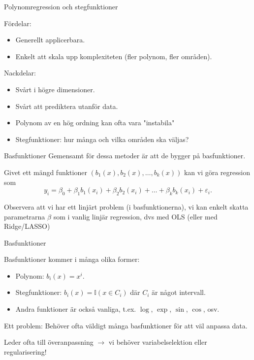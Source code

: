 \documentclass[10pt,english]{beamer}
\begin{document}
\begin{frame}{Polynomregression och stegfunktioner}
    
    Fördelar:
    \begin{itemize}
        \item Generellt applicerbara.
        \item Enkelt att skala upp komplexiteten (fler polynom, fler områden).
    \end{itemize}

    Nackdelar:
    \begin{itemize}
        \item Svårt i högre dimensioner.
        \item Svårt att prediktera utanför data.
        \item Polynom av en hög ordning kan ofta vara "instabila"
        \item Stegfunktioner: hur många och vilka områden ska väljas?
    \end{itemize}
\end{frame}

\begin{frame}{Basfunktioner}
    Gemensamt för dessa metoder är att de bygger på basfunktioner.

    Givet ett mängd funktioner $(b_1(x), b_2(x), \ldots, b_k(x))$ kan vi göra regression som
    \begin{equation*}
        y_i = \beta_0 + \beta_1 b_1(x_i) + \beta_2 b_2(x_i) + \ldots + \beta_k b_k(x_i) + \varepsilon_i.
    \end{equation*}

    Observera att vi har ett linjärt problem (i basfunktionerna), 
    vi kan enkelt skatta parametrarna $\beta$ som i vanlig linjär regression, dvs med OLS (eller med Ridge/LASSO)

\end{frame}

\begin{frame}{Basfunktioner}

    Basfunktioner kommer i många olika former:
    \begin{itemize}
        \item Polynom: $b_i(x) = x^i$.
        \item Stegfunktioner: $b_i(x) = \mathbb{I}(x \in C_i)$ där $C_i$ är något intervall.
        \item Andra funktioner är också vanliga, t.ex. $\log$, $\exp$, $\sin$, $\cos$, osv.
    \end{itemize}
    
    Ett problem: Behöver ofta väldigt många basfunktioner för att väl anpassa data. 
    
    Leder ofta till överanpassning $\rightarrow$ vi behöver variabelselektion eller regularisering!

\end{frame}
\end{document}
